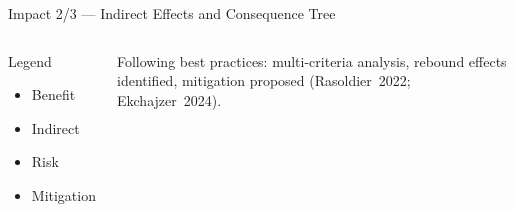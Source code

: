 \documentclass[aspectratio=169,10pt]{beamer}
\begin{document}
\begin{frame}{Impact 2/3 --- Indirect Effects and Consequence Tree}
  \begin{columns}[T]
    \vspace{-4pt}\centering
    \usebox{\conseqtreebox}
    \vspace{6pt}
    \begin{block}{\footnotesize Legend}
      \begin{itemize}\scriptsize
        \item[\textcolor{dkgreen}{$\blacksquare$}] Benefit
        \item[\textcolor{amber!80!black}{$\blacksquare$}] Indirect
        \item[\textcolor{alertred}{$\blacksquare$}] Risk
        \item[\textcolor{sky!60}{$\blacksquare$}] Mitigation
      \end{itemize}
    \end{block}
    \vspace{6pt}
    {\scriptsize Following best practices: multi-criteria analysis,
     rebound effects identified, mitigation proposed
     (Rasoldier~2022; Ekchajzer~2024).}
  \end{columns}
\end{frame}
\end{document}
